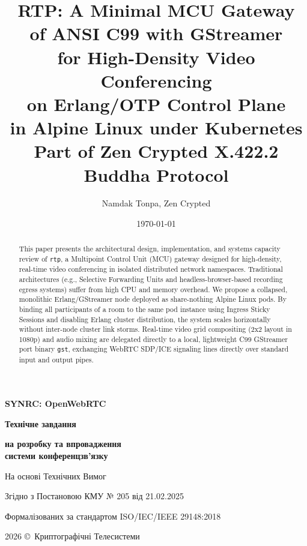 \documentclass{article}
\title{\textbf{RTP}: A Minimal MCU Gateway \\ of ANSI C99 with GStreamer \\
               for High-Density Video Conferencing \\
               on Erlang/OTP Control Plane \\
               in Alpine Linux under Kubernetes \\ [1ex]
       {\LARGE Part of Zen Crypted \textbf{X.422.2} Buddha Protocol}}
\author{Namdak Tonpa, Zen Crypted}
\date{\today}
\newcommand\HUGE[1]{\fontsize{40}{40}\selectfont #1}
\begin{document}
\begin{titlepage}
  \AddToShipoutPictureBG*{\AtPageLowerLeft{\color{nato}\rule{\paperwidth}{\paperheight}}}
  \color{white}\thispagestyle{empty}\vspace*{3cm}\centering
  {\Huge  \textbf{SYNRC: OpenWebRTC} \par} \vspace{1.5cm}
  {\HUGE  \textbf{Технічне завдання} \par} \vspace{1.5cm}
  {\LARGE \textbf{на розробку та впровадження \\ системи конференцзв'язку} \par} \vspace{1.5cm}
  {\large На основі Технічних Вимог \par}
  {\large Згідно з Постановою КМУ № 205 від 21.02.2025 \par}
  {\large Формалізованих за стандартом ISO/IEC/IEEE 29148:2018 \par}
  \vfill
  {\large 2026 \copyright\ Криптографічні Телесистеми \par}
\end{titlepage}

\newpage
\maketitle

\begin{abstract}
This paper presents the architectural design, implementation, and systems capacity review of \texttt{rtp},
a Multipoint Control Unit (MCU) gateway designed for high-density, real-time video conferencing in isolated
distributed network namespaces. Traditional architectures (e.g., Selective Forwarding Units and
headless-browser-based recording egress systems) suffer from high CPU and memory overhead.
We propose a collapsed, monolithic Erlang/GStreamer node deployed as share-nothing Alpine
Linux pods. By binding all participants of a room to the same pod instance using Ingress
Sticky Sessions and disabling Erlang cluster distribution,
the system scales horizontally without inter-node cluster link storms. Real-time video grid
compositing (2x2 layout in 1080p) and audio mixing are delegated directly to a local,
lightweight C99 GStreamer port binary \texttt{gst}, exchanging WebRTC SDP/ICE signaling lines directly over
standard input and output pipes.
\end{abstract}

\newpage
\tableofcontents
\end{document}
